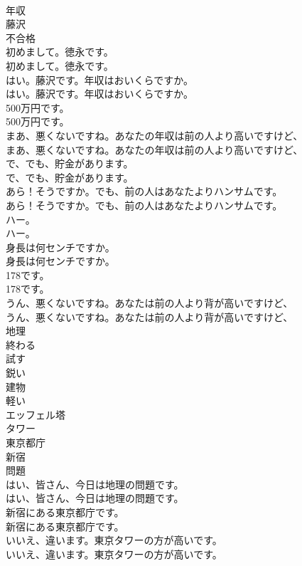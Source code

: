 \documentclass[8pt]{extreport}
\begin{document}
\begin{CJK}{UTF8}{min}
\\	年収
\\	藤沢
\\	不合格
\\	初めまして。徳永です。	
\\	初めまして。徳永です。 
\\	はい。藤沢です。年収はおいくらですか。	
\\	はい。藤沢です。年収はおいくらですか。 
\\	500万円です。	
\\	500万円です。 
\\	まあ、悪くないですね。あなたの年収は前の人より高いですけど、	
\\	まあ、悪くないですね。あなたの年収は前の人より高いですけど、 
\\	で、でも、貯金があります。	
\\	で、でも、貯金があります。 
\\	あら！そうですか。でも、前の人はあなたよりハンサムです。	
\\	あら！そうですか。でも、前の人はあなたよりハンサムです。 
\\	ハー。	
\\	ハー。 
\\	身長は何センチですか。	
\\	身長は何センチですか。 
\\	178です。	
\\	178です。 
\\	うん、悪くないですね。あなたは前の人より背が高いですけど、	
\\	うん、悪くないですね。あなたは前の人より背が高いですけど、 
\\	地理
\\	終わる
\\	試す
\\	鋭い
\\	建物
\\	軽い
\\	エッフェル塔
\\	タワー
\\	東京都庁
\\	新宿
\\	問題
\\	はい、皆さん、今日は地理の問題です。	
\\	はい、皆さん、今日は地理の問題です。 
\\	新宿にある東京都庁です。	
\\	新宿にある東京都庁です。 
\\	いいえ、違います。東京タワーの方が高いです。	
\\	いいえ、違います。東京タワーの方が高いです。 

\end{CJK}
\end{document}
